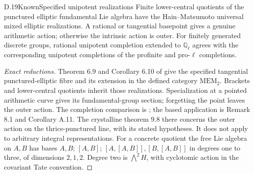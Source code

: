 \begin{statement}{D.19}{Known}{Specified unipotent realizations}
Finite lower-central quotients of the punctured elliptic
fundamental Lie algebra have the Hain--Matsumoto universal
mixed elliptic realizations. A rational or tangential
basepoint gives a genuine arithmetic action; otherwise
the intrinsic action is outer.
For finitely generated discrete groups, rational unipotent
completion extended to $\mathbb Q_\ell$ agrees with
the corresponding unipotent completions of the profinite
and pro-$\ell$ completions.
\end{statement}
\begin{proof}[Exact reductions]
Theorem 6.9 and Corollary 6.10 of \cite{D_HMelliptic}
give the specified tangential punctured-elliptic fibre and
its extension in the defined category $\mathrm{MEM}_2$.
Brackets and lower-central quotients inherit those
realizations. Specialization at a pointed arithmetic
curve gives its fundamental-group section; forgetting
the point leaves the outer action.
The completion comparison is
\cite[Theorem A.6]{D_HMweighted}; the based application
is Remark 8.1 and Corollary A.11.
The crystalline theorem 9.8 there concerns the outer
action on the thrice-punctured line, with its stated
hypotheses. It does not apply to arbitrary integral
representations.
For a concrete quotient the free Lie algebra on $A,B$
has bases $A,B$; $[A,B]$;
$[A,[A,B]],[B,[A,B]]$ in degrees one to three,
of dimensions $2,1,2$.
Degree two is $\bigwedge^2H$, with cyclotomic action
in the covariant Tate convention.
\end{proof}

